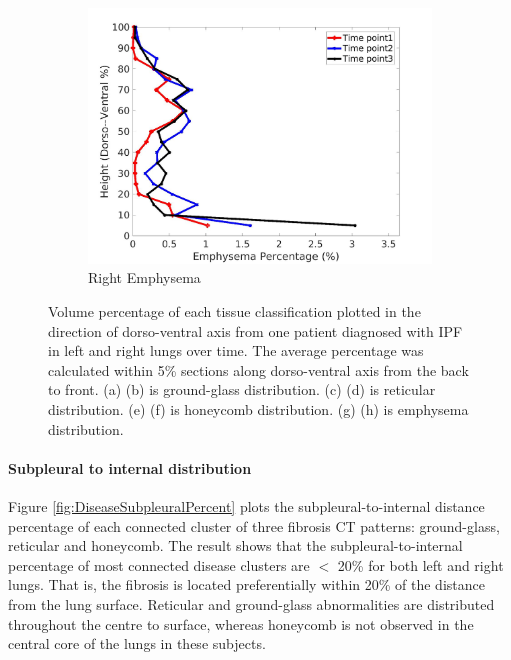 \begin{figure}[H]
\begin{subfigure}{.42\linewidth}
  \includegraphics[width=\linewidth,trim={{.0\wd0} {.0\wd0} {.0\wd0} {.0\wd0}},clip]{QuantitativeAnalysis/Image/IPF21RightLungEmphysemaDiseaseDorsoToVentral.jpg}
  \caption{Right Emphysema}
  \label{fig:IPF21DiseaseDorsoToVentralMain-h}
\end{subfigure}
\caption{Volume percentage of each tissue classification plotted in the direction of dorso-ventral axis from one patient diagnosed with IPF in left and right lungs over time. The average percentage was calculated within 5\% sections along dorso-ventral axis from the back to front. (a) (b) is ground-glass distribution. (c) (d) is reticular distribution. (e) (f) is honeycomb distribution. (g) (h) is emphysema distribution.}
\label{fig:IPF21DiseaseDorsoToVentralMain}
\end{figure}

\paragraph{Subpleural to internal distribution}
Figure \ref{fig:DiseaseSubpleuralPercent} plots the subpleural-to-internal distance percentage of each connected cluster of three fibrosis CT patterns: ground-glass, reticular and honeycomb. The result shows that the subpleural-to-internal percentage of most connected disease clusters are $<$ 20\% for both left and right lungs. That is, the fibrosis is located preferentially within 20\% of the distance from the lung surface. Reticular and ground-glass abnormalities are distributed throughout the centre to surface, whereas honeycomb is not observed in the central core of the lungs in these subjects.


